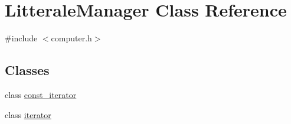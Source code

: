 \hypertarget{class_litterale_manager}{}\section{Litterale\+Manager Class Reference}
\label{class_litterale_manager}


{\ttfamily \#include $<$computer.\+h$>$}

\subsection*{Classes}
\begin{DoxyCompactItemize}
\item 
class \hyperlink{class_litterale_manager_1_1const__iterator}{const\+\_\+iterator}
\item 
class \hyperlink{class_litterale_manager_1_1iterator}{iterator}
\end{DoxyCompactItemize}
